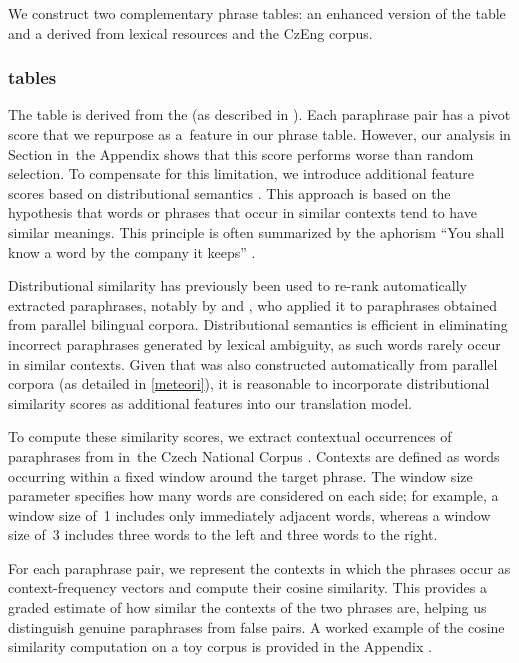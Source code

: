 We construct two complementary phrase tables: an enhanced version of the \cmpt table and a \owpt derived from lexical resources and the CzEng corpus.

\subsubsection{\enhanedmeteor tables}

The \enhanedmeteor table is derived from the \cmpt (as described in ). Each paraphrase pair has a pivot score that we repurpose as a~feature in our phrase table. However, our analysis in Section  in~the Appendix shows that this score performs worse than random selection. To compensate for this limitation, we introduce additional feature scores based on distributional semantics \citep{miller-91}. This approach is based on the hypothesis that words or phrases that occur in similar contexts tend to have similar meanings. This principle is often summarized by the aphorism ``You shall know a word by the company it keeps'' \citep{firth1957}. 

Distributional similarity has previously been used to re-rank automatically extracted paraphrases, notably by \cite{chan-etal-2011-reranking} and \cite{ppdb}, who applied it to paraphrases obtained from parallel bilingual corpora. Distributional semantics is efficient in eliminating incorrect paraphrases generated by lexical ambiguity, as such words rarely occur in similar contexts. Given that \cmpt was also constructed automatically from parallel corpora (as detailed in \cref{meteori}), it is reasonable to incorporate distributional similarity scores as additional features into our translation model.

To compute these similarity scores, we extract contextual occurrences of paraphrases from \cmpt in~the Czech National Corpus \citep{SYN2010}. Contexts are defined as words occurring within a fixed window around the target phrase. The window size parameter specifies how many words are considered on each side; for example, a window size of~1 includes only immediately adjacent words, whereas a window size of~3 includes three words to the left and three words to the right.

For each paraphrase pair, we represent the contexts in which the phrases occur as context-frequency vectors and compute their cosine similarity. This provides a graded estimate of how similar the contexts of the two phrases are, helping us distinguish genuine paraphrases from false pairs.  A worked example of the cosine similarity computation on a toy corpus is provided in the Appendix .

